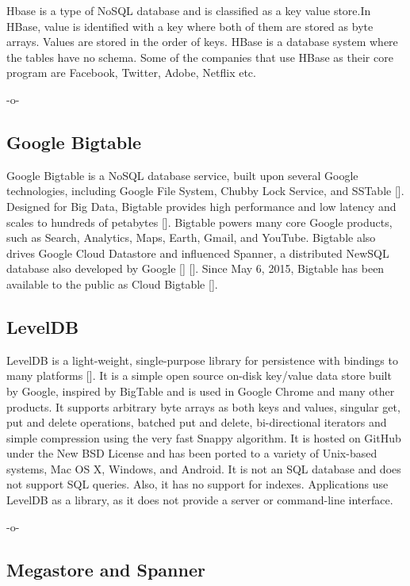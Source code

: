 Hbase is a type of NoSQL database and is classified as a key value
store.In HBase, value is identified with a key where both of them are
stored as byte arrays. Values are stored in the order of keys. HBase
is a database system where the tables have no schema. Some of the
companies that use HBase as their core program are Facebook, Twitter,
Adobe, Netflix etc.

     -o-

\subsection{Google Bigtable}

Google Bigtable is a NoSQL database service, built upon several Google
technologies, including Google File System, Chubby Lock Service, and
SSTable [\cite{www-cloudbigtable}].  Designed for Big Data, Bigtable
provides high performance and low latency and scales to hundreds of
petabytes [\cite{www-cloudbigtable}]. Bigtable powers many core Google
products, such as Search, Analytics, Maps, Earth, Gmail, and
YouTube. Bigtable also drives Google Cloud Datastore and influenced
Spanner, a distributed NewSQL database also developed by Google
[\cite{www-wikispanner}] [\cite{www-wikibigtable}].  Since May 6,
2015, Bigtable has been available to the public as Cloud Bigtable
[\cite{www-wikibigtable}].

\subsection{LevelDB}

LevelDB is a light-weight, single-purpose library for persistence with
bindings to many platforms [\cite{www-leveldb}]. It is a simple open
source on-disk key/value data store built by Google, inspired by
BigTable and is used in Google Chrome and many other products. It
supports arbitrary byte arrays as both keys and values, singular get,
put and delete operations, batched put and delete, bi-directional
iterators and simple compression using the very fast Snappy
algorithm. It is hosted on GitHub under the New BSD License and has
been ported to a variety of Unix-based systems, Mac OS X, Windows, and
Android. It is not an SQL database and does not support SQL
queries. Also, it has no support for indexes. Applications use LevelDB
as a library, as it does not provide a server or command-line
interface.

     -o-

\subsection{Megastore and Spanner}

